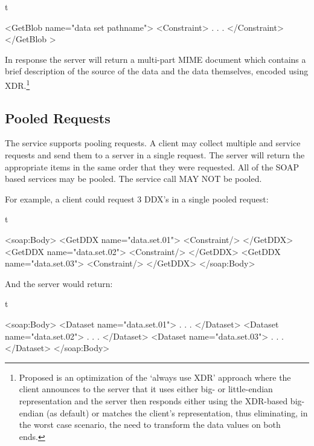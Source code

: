 \documentclass[justify]{dods-paper}
\begin{document}
\begin{vcode}{t}

    <GetBlob name="data set pathname">
        <Constraint>
            .
            .
            .
        </Constraint>
    </GetBlob >
    
    
\end{vcode}

In response the server will return a multi-part MIME document which
contains a brief description of the source of the data and the data
themselves, encoded using XDR.\footnote{Proposed is an optimization of
  the `always use XDR' approach where the client announces to the
  server that it uses either big- or little-endian representation and
  the server then responds either using the XDR-based big-endian (as
  default) or matches the client's representation, thus eliminating,
  in the worst case scenario, the need to transform the data values on
  both ends.}

\subsection {Pooled Requests}
\label {pooled}

The \ODSN service supports pooling requests. A client may collect
multiple \GetDDX and \GetData service requests and send them to a
server in a single request. The server will return the appropriate
items in the same order that they were requested. All of the SOAP
based \FSs services may be pooled. The \GetBlob service call MAY NOT
be pooled.

For example, a client could request 3 DDX's in a single pooled request:


\begin{vcode}{t}

    <soap:Body>
        <GetDDX name="data.set.01">
            <Constraint/>
        </GetDDX>
        <GetDDX name="data.set.02">
            <Constraint/>
        </GetDDX>
        <GetDDX name="data.set.03">
            <Constraint/>
        </GetDDX>
    </soap:Body>
    
    
\end{vcode}


And the server would return:

\begin{vcode}{t}


    <soap:Body>
        <Dataset name="data.set.01">
            .
            .
            .
        </Dataset>
        <Dataset name="data.set.02">
            .
            .
            .
        </Dataset>
        <Dataset name="data.set.03">
            .
            .
            .
        </Dataset>
    </soap:Body>
    
\end{vcode}
\end{document}
